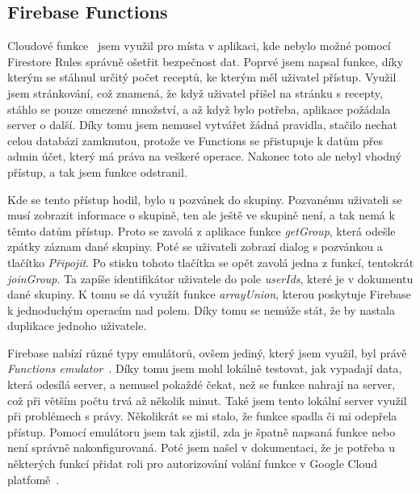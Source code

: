 \subsection{Firebase Functions}
Cloudové funkce~\cite{FirebaseFunctions} jsem využil pro místa v aplikaci, kde nebylo možné pomocí Firestore Rules správně ošetřit bezpečnost dat.
Poprvé jsem napsal funkce, díky kterým se stáhnul určitý počet receptů, ke kterým měl uživatel přístup. Využil jsem stránkování,
což znamená, že když uživatel přišel na stránku s recepty, stáhlo se pouze omezené množství, a až když bylo potřeba, aplikace požádala
server o další. Díky tomu jsem nemusel vytvářet žádná pravidla, stačilo nechat celou databázi zamknutou, protože ve Functions se přistupuje
k datům přes admin účet, který má práva na veškeré operace. Nakonec toto ale nebyl vhodný přístup, a tak jsem funkce odstranil.

Kde se tento přístup hodil, bylo u pozvánek do skupiny. Pozvanému uživateli se musí zobrazit informace o skupině, ten ale ještě ve skupině není,
a tak nemá k těmto datům přístup. Proto se zavolá z aplikace funkce \emph{getGroup}, která odešle zpátky záznam dané skupiny. Poté se uživateli
zobrazí dialog s pozvánkou a tlačítko \emph{Připojit}. Po stisku tohoto tlačítka se opět zavolá jedna z funkcí, tentokrát \emph{joinGroup}. Ta
zapíše identifikátor uživatele do pole \emph{userIds}, které je v dokumentu dané skupiny. K tomu se dá využít funkce \emph{arrayUnion}, kterou poskytuje
Firebase k jednoduchým operacím nad polem. Díky tomu se nemůže stát, že by nastala duplikace jednoho uživatele.

Firebase nabízí různé typy emulátorů, ovšem jediný, který jsem využil, byl právě \emph{Functions emulator}~\cite{FirebaseEmulator}. Díky tomu jsem mohl lokálně testovat, jak vypadají
data, která odesílá server, a nemusel pokaždé čekat, než se funkce nahrají na server, což při větším počtu trvá až několik minut. Také jsem tento lokální server
využil při problémech s právy. Několikrát se mi stalo, že funkce spadla či mi odepřela přístup. Pomocí emulátoru jsem tak zjistil, zda je špatně napsaná funkce
nebo není správně nakonfigurovaná. Poté jsem našel v dokumentaci, že je potřeba u některých funkcí přidat roli pro autorizování volání funkce v Google
Cloud platfomě~\cite{CloudRights}.


